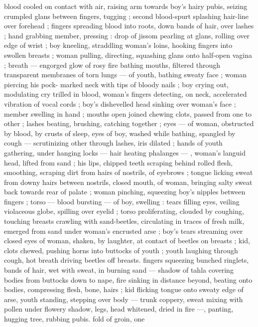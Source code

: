 blood cooled on contact with air, raising arm towards boy's hairy 
pubis, seizing crumpled glans between fingers, tugging ; second 
blood-spurt splashing hair-line over forehead ; fingers spreading 
blood into roots, down bands of hair, over lashes ; hand grabbing 
member, pressing : drop of jissom pearling at glans, rolling over 
edge of wrist ; boy kneeling, straddling woman's loins, hooking 
fingers into swollen breasts ; woman pulling, directing, squashing 
glans onto half-open vagina ; breath --- engorged glow of rosy fire 
bathing mouths, filtered through transparent membranes of torn 
lungs --- of youth, bathing sweaty face ; woman piercing his pock- 
marked neck with tips of bloody nails ; boy crying out, modulating 
cry trilled in blood, woman's fingers detecting, on neck, accelerated 
vibration of vocal cords ; boy's dishevelled head sinking over 
woman's face ; member swelling in hand ; mouths open joined 
chewing clots, passed from one to other ; lashes beating, brushing, 
catching together ; eyes --- of woman, obstructed by blood, by 
crusts of sleep, eyes of boy, washed while bathing, spangled by 
cough --- scrutinizing other through lashes, iris dilated ; hands of 
youth gathering, under hanging locks --- hair heating phalanges --- 
, woman's languid head, lifted from sand ; his lips, chipped teeth 
scraping behind rolled flesh, smoothing, scraping dirt from hairs of 
nostrils, of eyebrows ; tongue licking sweat from downy hairs 
between nostrils, closed mouth, of woman, bringing salty sweat back 
towards rear of palate ; woman pinching, squeezing boy's nipples 
between fingers ; torso --- blood bursting --- of boy, swelling : tears 
filling eyes, veiling violaceous globe, spilling over eyelid ; torso 
proliferating, clouded by coughing, touching breasts crawling with 
sand-beetles, circulating in traces of fresh milk, emerged from sand 
under woman's encrusted arse ; boy's tears streaming over closed 
eyes of woman, shaken, by laughter, at contact of beetles on breasts 
; kid, clots chewed, pushing horns into buttocks of youth ; youth 
laughing through cough, hot breath driving beetles off breasts. 
fingers squeezing bunched ringlets, bands of hair, wet with sweat, in 
burning sand --- shadow of tahla covering bodies from buttocks 
down to nape, fire sinking in distance beyond, beating onto bodies, 
compressing flesh, bone, hairs ; kid flicking tongue onto sweaty edge 
of arse, youth standing, stepping over body --- trunk coppery, sweat 
mixing with pollen under flowery shadow, legs, head whitened, dried 
in fire ---, panting, hugging tree, rubbing pubis. fold of groin, one 
